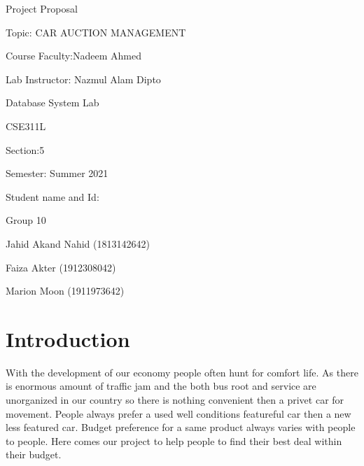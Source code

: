 \documentclass{report}
\begin{document}
\begin{titlepage}
\vspace{4\baselineskip}

{\large Project Proposal}
\vspace{4.5\baselineskip}

{\Large Topic: CAR AUCTION MANAGEMENT   }
	\vspace{2.5\baselineskip}
	
	{\Large Course Faculty:Nadeem Ahmed }
	\vspace{0.5\baselineskip}
	
	
{\Large Lab Instructor: Nazmul Alam Dipto }
	\vspace{4.5\baselineskip}


{\Large Database System Lab     \vspace{0.5\baselineskip}
		
		CSE311L \vspace{0.5\baselineskip}
		
		Section:5 \vspace{0.5\baselineskip}
		
		Semester: Summer 2021 \vspace{0.5\baselineskip} }
		\vspace{4.5\baselineskip}
		
{\Large Student name and Id:     \vspace{0.5\baselineskip}
		
		Group 10 \vspace{0.5\baselineskip}
		}
		
{\Large Jahid Akand Nahid (1813142642)\vspace{0.5\baselineskip}
		
		Faiza Akter (1912308042) \vspace{0.5\baselineskip}
		
		Marion Moon (1911973642)\vspace{0.5\baselineskip}
		}
		
\end{titlepage}	

\section{Introduction}
With the development of our economy people often hunt for comfort life. As there is enormous amount of traffic jam and the both bus root and service are unorganized in our country so there is nothing convenient then a privet car for movement. People always prefer a used well conditions featureful car then a new less featured car. Budget preference for a same product always varies with people to people. Here comes our project to help people to find their best deal within their budget.
\end{document}
